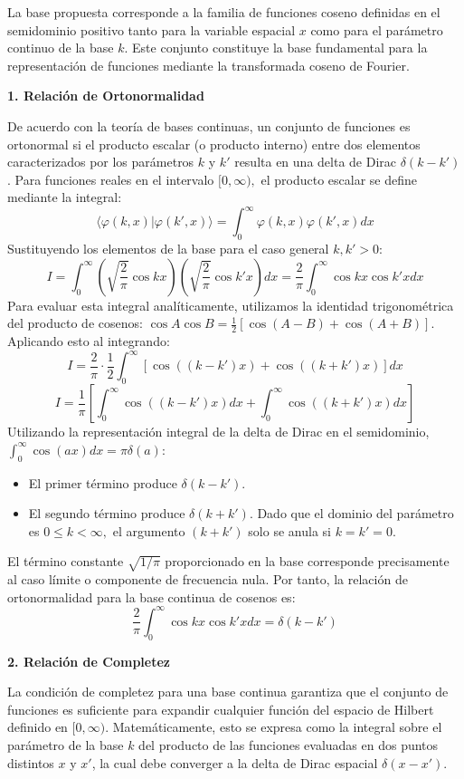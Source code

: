 \documentclass[a4paper]{article}
\begin{document}
La base propuesta corresponde a la familia de funciones coseno definidas en el semidominio positivo tanto para la variable espacial $x$ como para el parámetro continuo de la base $k$. Este conjunto constituye la base fundamental para la representación de funciones mediante la transformada coseno de Fourier.

\textbf{1. Relación de Ortonormalidad}

De acuerdo con la teoría de bases continuas, un conjunto de funciones es ortonormal si el producto escalar (o producto interno) entre dos elementos caracterizados por los parámetros $k$ y $k'$ resulta en una delta de Dirac $\delta(k - k')$. Para funciones reales en el intervalo $[0, \infty),$ el producto escalar se define mediante la integral:
$$ \langle \varphi(k, x) | \varphi(k', x) \rangle = \int_{0}^{\infty} \varphi(k, x) \varphi(k', x) dx $$
Sustituyendo los elementos de la base para el caso general $k, k' > 0$:
$$ I = \int_{0}^{\infty} \left( \sqrt{\frac{2}{\pi}} \cos kx \right) \left( \sqrt{\frac{2}{\pi}} \cos k'x \right) dx = \frac{2}{\pi} \int_{0}^{\infty} \cos kx \cos k'x dx $$
Para evaluar esta integral analíticamente, utilizamos la identidad trigonométrica del producto de cosenos: $\cos A \cos B = \frac{1}{2} [\cos(A-B) + \cos(A+B)]$. Aplicando esto al integrando:
$$ I = \frac{2}{\pi} \cdot \frac{1}{2} \int_{0}^{\infty} [ \cos((k - k')x) + \cos((k + k')x) ] dx $$
$$ I = \frac{1}{\pi} \left[ \int_{0}^{\infty} \cos((k - k')x) dx + \int_{0}^{\infty} \cos((k + k')x) dx \right] $$
Utilizando la representación integral de la delta de Dirac en el semidominio, $\int_{0}^{\infty} \cos(ax) dx = \pi \delta(a)$:
\begin{itemize}
    \item El primer término produce $\delta(k - k')$.
    \item El segundo término produce $\delta(k + k')$. Dado que el dominio del parámetro es $0 \le k < \infty,$ el argumento $(k + k')$ solo se anula si $k = k' = 0$.
\end{itemize}
El término constante $\sqrt{1/\pi}$ proporcionado en la base corresponde precisamente al caso límite o componente de frecuencia nula. Por tanto, la relación de ortonormalidad para la base continua de cosenos es:
$$ \frac{2}{\pi} \int_{0}^{\infty} \cos kx \cos k'x dx = \delta(k - k') $$

\textbf{2. Relación de Completez}

La condición de completez para una base continua garantiza que el conjunto de funciones es suficiente para expandir cualquier función del espacio de Hilbert definido en $[0, \infty)$. Matemáticamente, esto se expresa como la integral sobre el parámetro de la base $k$ del producto de las funciones evaluadas en dos puntos distintos $x$ y $x'$, la cual debe converger a la delta de Dirac espacial $\delta(x - x')$.
\end{document}
